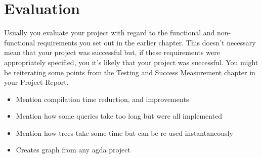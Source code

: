 
\chapter{Evaluation}

Usually you evaluate your project with regard to the functional and non-functional
requirements you set out in the earlier chapter. This doesn’t necessary mean that your project was
successful but, if these requirements were appropriately specified, you it’s likely that your project was
successful. You might be reiterating some points from the Testing and Success Measurement
chapter in your Project Report.

\begin{itemize}
\item Mention compilation time reduction, and improvements 
\item Mention how some queries take too long but were all implemented 
\item Mention how trees take some time but can be re-used instantaneously 
\item Creates graph from any agda project
\end{itemize}
